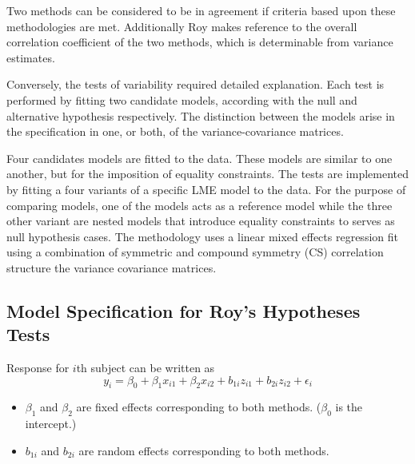 \documentclass[12pt, a4paper]{report}
\theoremstyle{plain}
\theoremstyle{definition}
\theoremstyle{remark}
\begin{document}
	Two methods can be considered to be in agreement if criteria based upon these methodologies are met. Additionally Roy makes reference to the overall correlation coefficient of the two methods, which is determinable from variance estimates.
	
	Conversely, the tests of variability required detailed explanation. Each test is performed by fitting two candidate models, according with the null and alternative hypothesis respectively. The distinction between the models arise in the specification in one, or both, of the variance-covariance matrices. %
		
Four candidates models are fitted to the data. These models are similar to one another, but for the imposition of equality constraints. The tests are implemented by fitting a four variants of a specific LME model to the data. For the purpose of comparing models, one of the models acts as a reference model while the three other variant are nested models that introduce equality constraints to serves as null hypothesis cases. The methodology uses a linear mixed effects regression fit using a combination of symmetric and compound symmetry (CS) correlation structure the variance covariance matrices.
		

	\subsection{Model Specification for Roy's Hypotheses Tests}
	
	Response for $i$th subject can be written as
	\[ y_i = \beta_0 + \beta_1x_{i1} + \beta_2x_{i2} + b_{1i}z_{i1}  + b_{2i}z_{i2} + \epsilon_i \]
	\begin{itemize}
		\item $\beta_1$ and $\beta_2$ are fixed effects corresponding to both methods. ($\beta_0$ is the intercept.)
		\item $b_{1i}$ and $b_{2i}$ are random effects corresponding to both methods.
	\end{itemize}
	
\end{document}
